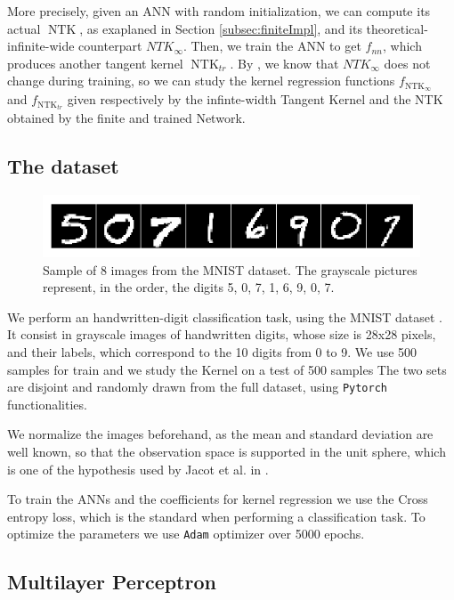 \documentclass[11pt,notitlepage]{article}
\numberwithin{equation}{section}
\DeclareMathOperator{\NTK}{NTK}
\theoremstyle{remark}
\theoremstyle{definition}
\begin{document}
	More precisely, given an ANN with random initialization, we can compute its actual $\NTK$, as exaplaned in Section \ref{subsec:finiteImpl}, and its theoretical-infinite-wide counterpart $NTK_\infty$.
	Then, we train the ANN to get $f_{nn}$, which produces another tangent kernel $\NTK_{tr}$.
	By \cite{jacot2018neural}, we know that $NTK_\infty$ does not change during training, so we can study the kernel regression functions $f_{\NTK_\infty}$ and $f_{\NTK_{tr}}$ given respectively by the infinte-width Tangent Kernel and the NTK obtained by the finite and trained Network.
	
	\subsection{The dataset}\label{subsec:dataset}
		
	\begin{figure}[t]
		\centering
		\includegraphics[width=.75\linewidth]{../Simulations/figures/mnist_sample.png}
		\caption{Sample of 8 images from the MNIST dataset.
			The grayscale pictures represent, in the order, the digits 5, 0, 7, 1, 6, 9, 0, 7.}
	\end{figure}
	
	We perform an handwritten-digit classification task, using the MNIST dataset \cite{lecun2010mnist}.
	It consist in grayscale images of handwritten digits, whose size is 28x28 pixels, and their labels, which correspond to the 10 digits from 0 to 9.	
	We use 500 samples for train and we study the Kernel on a test of 500 samples
	The two sets are disjoint and randomly drawn from the full dataset, using \verb|Pytorch| functionalities.

	We normalize the images beforehand, as the mean and standard deviation are well known, so that the observation space is supported in the unit sphere, which is one of the hypothesis used by Jacot et al. in \cite{jacot2018neural}.
	
	To train the ANNs and the coefficients for kernel regression we use the Cross entropy loss, which is the standard when performing a classification task.
	To optimize the parameters we use \verb|Adam| optimizer \cite{kingma2014adam} over 5000 epochs.
	
	\subsection{Multilayer Perceptron}
	
\end{document}
